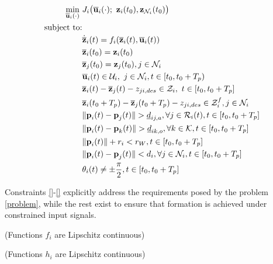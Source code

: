 \begin{align}
  \min\limits_{\overline{\bm{\mathbf{u}}}_i (\cdot)}\ &
    J_i \big(\overline{\bm{\mathbf{u}}}_i (\cdot);\ \bm{\mathbf{z}}_i(t_0), \bm{\mathbf{z}}_{\mathcal{N}_i}(t_0)\big) \\
  \text{subject to:} & \\
  & \dot{\overline{\bm{\mathbf{z}}}}_i(t) = f_i (\overline{\bm{\mathbf{z}}}_i (t), \overline{\bm{\mathbf{u}}}_i (t)) \\
  & \overline{\bm{\mathbf{z}}}_i (t_0) = \bm{\mathbf{z}}_i (t_0) \\
  & \overline{\bm{\mathbf{z}}}_j (t_0) = \bm{\mathbf{z}}_j (t_0), j \in \mathcal{N}_i \\
  & \overline{\bm{\mathbf{u}}}_i(t) \in \mathcal{U}_i,\ j \in \mathcal{N}_i, t \in [t_0, t_0 + T_p)\\
  & \overline{\bm{\mathbf{z}}}_i (t) - \overline{\bm{\mathbf{z}}}_j (t) - z_{ji, des} \in \mathcal{Z}_i,\ t \in [t_0, t_0 + T_p]\\
  & \overline{\bm{\mathbf{z}}}_i (t_0 + T_p) - \overline{\bm{\mathbf{z}}}_j (t_0 + T_p) - z_{ji,des} \in \mathcal{Z}_i^f, j \in \mathcal{N}_i \\
  & \|\bm{\mathbf{p}}_i(t) - \bm{\mathbf{p}}_j(t)\| > \underline{d}_{ij,a}, \forall j \in \mathcal{R}_i(t), t \in [t_0, t_0 + T_p] \\
  & \|\bm{\mathbf{p}}_i(t) - \bm{\mathbf{p}}_k(t)\| > \underline{d}_{ik,o}, \forall k \in \mathcal{K}, t \in [t_0, t_0 + T_p] \\
  & \|\bm{\mathbf{p}}_i(t)\| + r_i < r_W, t \in [t_0, t_0 + T_p] \\
  & \|\bm{\mathbf{p}}_i(t) - \bm{\mathbf{p}}_j(t)\| < d_i, \forall j \in \mathcal{N}_i, t \in [t_0, t_0 + T_p] \\
  & \theta_i(t) \ne \pm \frac{\pi}{2}, t \in [t_0, t_0 + T_p]
\end{align}

Constraints \ref{}-\ref{} explicitly address the
requirements posed by the problem \eqref{problem}, while the rest exist to
ensure that formation is achieved under constrained input signals.


\begin{gg_box}
\begin{assumption} (Functions $f_i$ are Lipschitz continuous)
  \label{ass:f_i_Lipschitz}
\end{assumption}
\end{gg_box}

\begin{gg_box}
\begin{assumption} (Functions $h_i$ are Lipschitz continuous)
  \label{ass:h_i_Lipschitz}
\end{assumption}
\end{gg_box}

